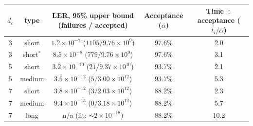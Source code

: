 \begin{tabular}{ccccc}
\toprule
$d_c$ & type & LER, 95\% upper bound (failures / accepted) & Acceptance ($\alpha$) & Time $\div$ acceptance ($t_i/\alpha$) \\
\midrule
3 & short & $1.2\times10^{-7}$ \; ($1105 / 9.76\times10^{9}$) & 97.6\% & 2.0 \\
3 & short$^*$ & $8.5\times10^{-8}$ \; ($779 / 9.76\times10^{9}$) & 97.6\% & 3.1 \\
5 & short & $3.2\times10^{-10}$ \; ($21 / 9.37\times10^{10}$) & 93.7\% & 2.1 \\
5 & medium & $3.5\times10^{-12}$ \; ($5 / 3.00\times10^{12}$) & 93.7\% & 5.3 \\
7 & short & $3.8\times10^{-12}$ \; ($3 / 2.03\times10^{12}$) & 88.2\% & 2.3 \\
7 & medium & $9.4\times10^{-13}$ \; ($0 / 3.18\times10^{12}$) & 88.2\% & 5.7 \\
7 & long & n/a \; (fit: ${\sim}2\times10^{-18}$) & 88.2\% & 10.2 \\
\bottomrule
\end{tabular}
